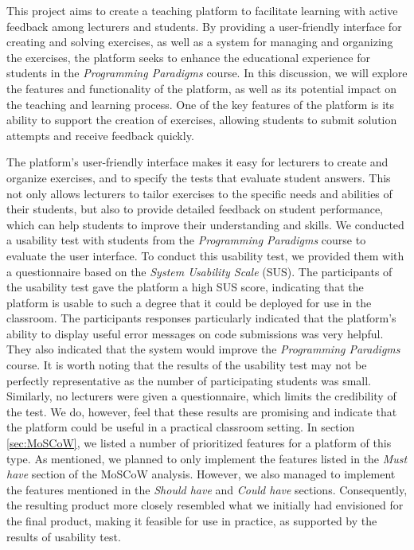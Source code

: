This project aims to create a teaching platform to facilitate learning with active feedback among lecturers and students.
By providing a user-friendly interface for creating and solving exercises, as well as a system for managing and organizing the exercises, the platform seeks to enhance the educational experience for students in the \textit{Programming Paradigms} course.
In this discussion, we will explore the features and functionality of the platform, as well as its potential impact on the teaching and learning process.
One of the key features of the platform is its ability to support the creation of exercises, allowing students to submit solution attempts and receive feedback quickly.

The platform's user-friendly interface makes it easy for lecturers to create and organize exercises, and to specify the tests that evaluate student answers. This not only allows lecturers to tailor exercises to the specific needs and abilities of their students, but also to provide detailed feedback on student performance, which can help students to improve their understanding and skills.
We conducted a usability test with students from the \textit{Programming Paradigms} course to evaluate the user interface.
To conduct this usability test, we provided them with a questionnaire based on the \textit{System Usability Scale} (SUS).
The participants of the usability test gave the platform a high SUS score, indicating that the platform is usable to such a degree that it could be deployed for use in the classroom. The participants responses particularly indicated that the platform's ability to display useful error messages on code submissions was very helpful.
They also indicated that the system would improve the \textit{Programming Paradigms} course.
It is worth noting that the results of the usability test may not be perfectly representative as the number of participating students was small.
Similarly, no lecturers were given a questionnaire, which limits the credibility of the test.
We do, however, feel that these results are promising and indicate that the platform could be useful in a practical classroom setting.
In section \ref{sec:MoSCoW}, we listed a number of prioritized features for a platform of this type.
As mentioned, we planned to only implement the features listed in the \textit{Must have} section of the MoSCoW analysis.
However, we also managed to implement the features mentioned in the \textit{Should have} and \textit{Could have} sections.
Consequently, the resulting product more closely resembled what we initially had envisioned for the final product, making it feasible for use in practice, as supported by the results of usability test.

